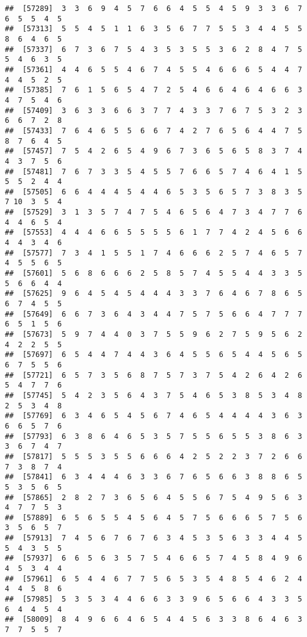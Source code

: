 \documentclass[
]{book}
\begin{document}
\begin{verbatim}
##  [57289]  3  3  6  9  4  5  7  6  6  4  5  5  4  5  9  3  3  6  7  6  5  5  4  5
##  [57313]  5  5  4  5  1  1  6  3  5  6  7  7  5  5  3  4  4  5  5  8  6  4  6  5
##  [57337]  6  7  3  6  7  5  4  3  5  3  5  5  3  6  2  8  4  7  5  5  4  6  3  5
##  [57361]  4  4  6  5  5  4  6  7  4  5  5  4  6  6  6  5  4  4  7  4  4  5  2  5
##  [57385]  7  6  1  5  6  5  4  7  2  5  4  6  6  4  6  4  6  6  3  4  7  5  4  6
##  [57409]  3  6  3  3  6  6  3  7  7  4  3  3  7  6  7  5  3  2  3  6  6  7  2  8
##  [57433]  7  6  4  6  5  5  6  6  7  4  2  7  6  5  6  4  4  7  5  8  7  6  4  5
##  [57457]  7  5  4  2  6  5  4  9  6  7  3  6  5  6  5  8  3  7  4  4  3  7  5  6
##  [57481]  7  6  7  3  3  5  4  5  5  7  6  6  5  7  4  6  4  1  5  5  5  2  4  4
##  [57505]  6  6  4  4  4  5  4  4  6  5  3  5  6  5  7  3  8  3  5  7 10  3  5  4
##  [57529]  3  1  3  5  7  4  7  5  4  6  5  6  4  7  3  4  7  7  6  4  4  6  5  4
##  [57553]  4  4  4  6  6  5  5  5  5  6  1  7  7  4  2  4  5  6  6  4  4  3  4  6
##  [57577]  7  3  4  1  5  5  1  7  4  6  6  6  2  5  7  4  6  5  7  4  5  5  6  5
##  [57601]  5  6  8  6  6  6  2  5  8  5  7  4  5  5  4  4  3  3  5  5  6  6  4  4
##  [57625]  9  6  4  5  4  5  4  4  4  3  3  7  6  4  6  7  8  6  5  6  7  4  5  5
##  [57649]  6  6  7  3  6  4  3  4  4  7  5  7  5  6  6  4  7  7  7  6  5  1  5  6
##  [57673]  5  9  7  4  4  0  3  7  5  5  9  6  2  7  5  9  5  6  2  4  2  2  5  5
##  [57697]  6  5  4  4  7  4  4  3  6  4  5  5  6  5  4  4  5  6  5  6  7  5  5  6
##  [57721]  6  5  7  3  5  6  8  7  5  7  3  7  5  4  2  6  4  2  6  5  4  7  7  6
##  [57745]  5  4  2  3  5  6  4  3  7  5  4  6  5  3  8  5  3  4  8  2  5  3  4  8
##  [57769]  6  3  4  6  5  4  5  6  7  4  6  5  4  4  4  4  3  6  3  6  6  5  7  6
##  [57793]  6  3  8  6  4  6  5  3  5  7  5  5  6  5  5  3  8  6  3  3  6  7  4  7
##  [57817]  5  5  5  3  5  5  6  6  6  4  2  5  2  2  3  7  2  6  6  7  3  8  7  4
##  [57841]  6  3  4  4  4  6  3  3  6  7  6  5  6  6  3  8  8  6  5  5  3  5  6  5
##  [57865]  2  8  2  7  3  6  5  6  4  5  5  6  7  5  4  9  5  6  3  4  7  7  5  3
##  [57889]  6  5  6  5  5  4  5  6  4  5  7  5  6  6  6  5  7  5  6  3  5  6  5  7
##  [57913]  7  4  5  6  7  6  7  6  3  4  5  3  5  6  3  3  4  4  5  5  4  3  5  5
##  [57937]  6  6  5  6  3  5  7  5  4  6  6  5  7  4  5  8  4  9  6  4  5  3  4  4
##  [57961]  6  5  4  4  6  7  7  5  6  5  3  5  4  8  5  4  6  2  4  4  4  5  8  6
##  [57985]  5  3  5  3  4  4  6  6  3  3  9  6  5  6  6  4  3  3  5  6  4  4  5  4
##  [58009]  8  4  9  6  6  4  6  5  4  4  5  6  3  3  8  6  4  6  3  7  7  5  5  7

\end{verbatim}
\end{document}
